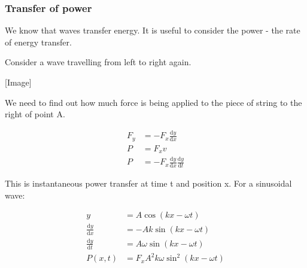 \documentclass[10pt,a4paper]{article}
\newcommand{\rmd}{\mathrm{d}}
\newcommand{\dif}[2]{\frac{\rmd #1}{\rmd #2}}
\begin{document}
\subsubsection*{Transfer of power}

We know that waves transfer energy. It is useful to consider the power - the rate of energy transfer.

Consider a wave travelling from left to right again.

[Image]

We need to find out how much force is being applied to the piece of string to the right of point A.

\begin{align*}
F_{y} &= -F_{x} \dif{y}{x} \\
P &= F_{x} v \\
P &= -F_{x} \dif{y}{x} \dif{y}{t}
\end{align*}

This is instantaneous power transfer at time t and position x. For a sinusoidal wave:

\begin{align*}
y &= A \cos(kx - \omega t) \\
\dif{y}{x} &= -Ak \sin(kx - \omega t) \\
\dif{y}{t} &= A \omega \sin (kx - \omega t) \\
P(x, t) &= F_{x} A^{2} k \omega \sin^{2} (kx - \omega t)
\end{align*}
\end{document}
